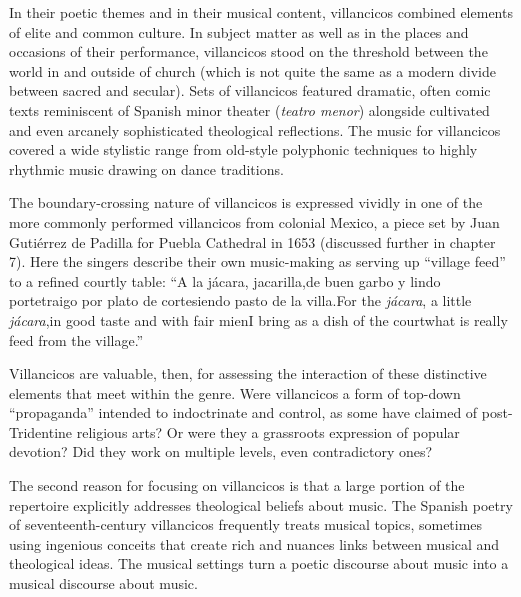 \documentclass[oneside,12pt]{book}
\begin{document}
    In their poetic themes and in their musical content, villancicos combined elements of elite and common culture. 
    In subject matter as well as in the places and occasions of their performance, villancicos stood on the threshold between the world in and outside of church (which is not quite the same as a modern divide between sacred and secular). 
    Sets of villancicos featured dramatic, often comic texts reminiscent of Spanish minor theater (\emph{teatro menor}) alongside cultivated and even arcanely sophisticated theological reflections.
    The music for villancicos covered a wide stylistic range from old-style polyphonic techniques to highly rhythmic music drawing on dance traditions.
  
    The boundary-crossing nature of villancicos is expressed vividly in one of the more commonly performed villancicos from colonial Mexico, a piece set by Juan Gutiérrez de Padilla for Puebla Cathedral in 1653 (discussed further in chapter 7).
    Here the singers describe their own music-making as serving up \enquote{village feed} to a refined courtly table:
    \enquote{A la jácara, jacarilla,de buen garbo y lindo portetraigo por plato de cortesiendo pasto de la villa.For the \emph{jácara}, a little \emph{jácara},in good taste and with fair mienI bring as a dish of the courtwhat is really feed from the village.}
  
    Villancicos are valuable, then, for assessing the interaction of these distinctive elements that meet within the genre.
    Were villancicos a form of top-down \enquote{propaganda} intended to indoctrinate and control, as some have claimed of post-Tridentine religious arts?
    Or were they a grassroots expression of popular devotion? 
    Did they work on multiple levels, even contradictory ones?
  
    The second reason for focusing on villancicos is that a large portion of the repertoire explicitly addresses theological beliefs about music.
    The Spanish poetry of seventeenth-century villancicos frequently treats musical topics, sometimes using ingenious conceits that create rich and nuances links between musical and theological ideas.
    The musical settings turn a poetic discourse about music into a musical discourse about music.
  
\end{document}
